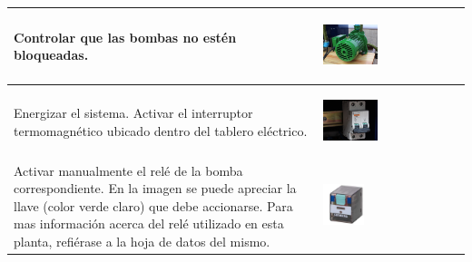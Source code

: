 \begin{table}[H]
\centering
\renewcommand*{\arraystretch}{0.01}
\begin{tabular}{*{2}{m{}}}
\hline
  Controlar que las bombas no estén bloqueadas.
  &\begin{center}
    \includegraphics[width=0.4\textwidth]
      {Anexos/images/bombaBottom.JPG}
  \end{center}\\
\hline
    Energizar el sistema. Activar el interruptor termomagnético ubicado dentro
    del tablero eléctrico.
    &\begin{center}
      \includegraphics[width=0.4\textwidth]
	{Anexos/images/disyuntor.JPG}
    \end{center}\\
\hline
    Activar manualmente el relé de la bomba correspondiente. En la imagen se
    puede apreciar la llave (color verde claro) que debe accionarse. Para mas 
    información acerca del relé utilizado en esta planta, refiérase a la
    hoja de datos del mismo.
    &\begin{center}
      \includegraphics[width=0.3\textwidth]{Anexos/images/rele.pdf}
    \end{center}\\
\hline
\end{tabular}
\end{table}
